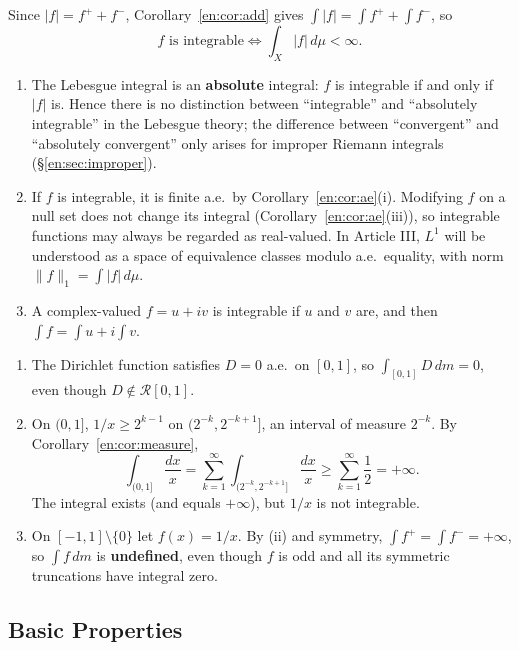 \documentclass[11pt]{article}
\makeatletter
\newcommand{\envlabel}[1]{\protected@edef\@currentlabel{\themathenv}\label{#1}}
\makeatother
\begin{document}
Since $|f|=f^{+}+f^{-}$, Corollary~\ref{en:cor:add} gives $\int|f|=\int f^{+}+\int f^{-}$, so
\[
f\text{ is integrable}\iff\int_{X}|f|\,d\mu<\infty.
\]

\begin{remark}\envlabel{en:rem:abs}
\leavevmode
\begin{enumerate}
  \item The Lebesgue integral is an \textbf{absolute} integral: $f$ is integrable if and only if $|f|$ is. Hence there is no distinction between ``integrable'' and ``absolutely integrable'' in the Lebesgue theory; the difference between ``convergent'' and ``absolutely convergent'' only arises for improper Riemann integrals (\S\ref{en:sec:improper}).
  \item If $f$ is integrable, it is finite a.e.\ by Corollary~\ref{en:cor:ae}(i). Modifying $f$ on a null set does not change its integral (Corollary~\ref{en:cor:ae}(iii)), so integrable functions may always be regarded as real-valued. In Article III, $L^{1}$ will be understood as a space of equivalence classes modulo a.e.\ equality, with norm $\|f\|_{1}=\int|f|\,d\mu$.
  \item A complex-valued $f=u+iv$ is integrable if $u$ and $v$ are, and then $\int f=\int u+i\int v$.
\end{enumerate}
\end{remark}

\begin{example}\envlabel{en:ex:int}
\leavevmode
\begin{enumerate}
  \item The Dirichlet function satisfies $D=0$ a.e.\ on $[0,1]$, so $\int_{[0,1]}D\,dm=0$, even though $D\notin\mathcal{R}[0,1]$.
  \item On $(0,1]$, $1/x\geq2^{k-1}$ on $(2^{-k},2^{-k+1}]$, an interval of measure $2^{-k}$. By Corollary~\ref{en:cor:measure},
  \[
  \int_{(0,1]}\frac{dx}{x}=\sum_{k=1}^{\infty}\int_{(2^{-k},2^{-k+1}]}\frac{dx}{x}\geq\sum_{k=1}^{\infty}\frac12=+\infty.
  \]
  The integral exists (and equals $+\infty$), but $1/x$ is not integrable.
  \item On $[-1,1]\setminus\{0\}$ let $f(x)=1/x$. By (ii) and symmetry, $\int f^{+}=\int f^{-}=+\infty$, so $\int f\,dm$ is \textbf{undefined}, even though $f$ is odd and all its symmetric truncations have integral zero.
\end{enumerate}
\end{example}

\subsection{Basic Properties}
\end{document}
